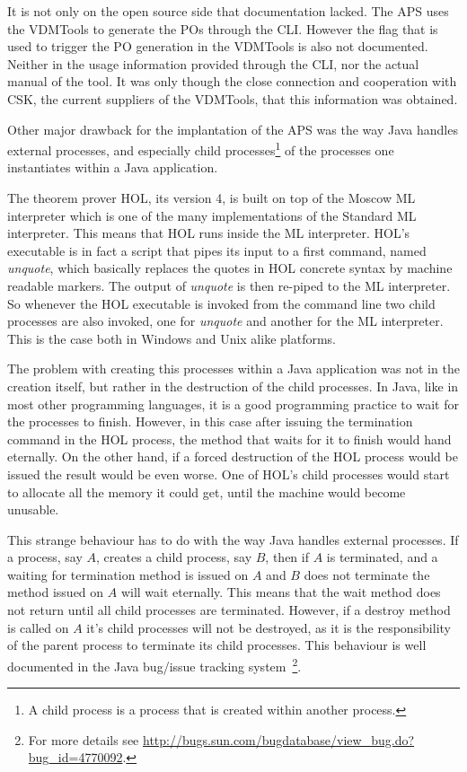 \documentclass[]{article}
\begin{document}
It is not only on the open source side that documentation lacked. 
The APS uses the VDMTools to generate the POs through the CLI.
However the flag that is used to trigger the PO generation in the VDMTools is also not documented.
Neither in the usage information provided through the CLI, nor the actual manual of the tool.
It was only though the close connection and cooperation with CSK, the current suppliers of the VDMTools, that this information was obtained.

Other major drawback for the implantation of the APS was the way Java handles external processes, and especially child processes\footnote{A child process is a process that is created within another process.} of the processes one instantiates within a Java application.

The theorem prover HOL, its version 4, is built on top of the Moscow ML interpreter which is one of the many implementations of the Standard ML interpreter.
This means that HOL runs inside the ML interpreter.
HOL's executable is in fact a script that pipes its input to a first command, named \emph{unquote}, which basically replaces the quotes in HOL concrete syntax by machine readable markers.
The output of \emph{unquote} is then re-piped to the ML interpreter.
So whenever the HOL executable is invoked from the command line two child processes are also invoked, one for \emph{unquote} and another for the ML interpreter.
This is the case both in Windows and Unix alike platforms.

The problem with creating this processes within a Java application was not in the creation itself, but rather in the destruction of the child processes.
In Java, like in most other programming languages, it is a good programming practice to wait for the processes to finish.
However, in this case after issuing the termination command in the HOL process, the method that waits for it to finish would hand eternally.
On the other hand, if a forced destruction of the HOL process would be issued the result would be even worse.
One of HOL's child processes would start to allocate all the memory it could get, until the machine would become unusable.

This strange behaviour has to do with the way Java handles external processes.
If a process, say $A$, creates a child process, say $B$, then if $A$ is terminated, and a waiting for termination method is issued on $A$ and $B$ does not terminate the method issued on $A$ will wait eternally.
This means that the wait method does not return until all child processes are terminated.
However, if a destroy method is called on $A$ it's child processes will not be destroyed, as it is the responsibility of the parent process to terminate its child processes.
This behaviour is well documented in the Java bug/issue tracking system~\footnote{For more details see \url{http://bugs.sun.com/bugdatabase/view\_bug.do?bug\_id=4770092}.}.
\end{document}
